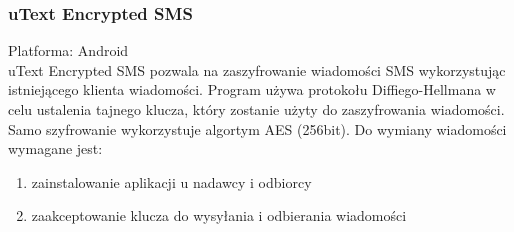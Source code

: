 \documentclass[xcolor=table]{beamer}
\begin{document}
\begin{frame}
  \frametitle{uText Encrypted SMS}
	
	Platforma: Android\\
	uText Encrypted SMS pozwala na zaszyfrowanie wiadomości SMS 
wykorzystując istniejącego klienta wiadomości. Program używa protokołu 
	Diffiego-Hellmana w celu ustalenia tajnego klucza, który zostanie użyty 
	do zaszyfrowania wiadomości. Samo szyfrowanie wykorzystuje algortym AES (256bit).
	Do wymiany wiadomości wymagane jest:
	\begin{enumerate}
	\item zainstalowanie aplikacji u nadawcy i odbiorcy 
	\item zaakceptowanie klucza do wysyłania i odbierania wiadomości
	\end{enumerate}
	
\end{frame}
\end{document}
